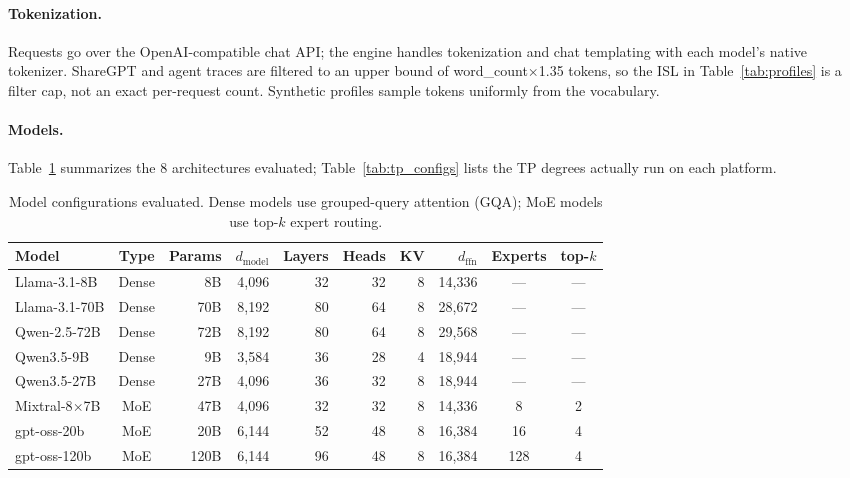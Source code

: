 \paragraph{Tokenization.} Requests go over the OpenAI-compatible chat API; the engine handles tokenization and chat templating with each model's native tokenizer. ShareGPT and agent traces are filtered to an upper bound of word\_count$\times$1.35 tokens, so the ISL in Table~\ref{tab:profiles} is a filter cap, not an exact per-request count. Synthetic profiles sample tokens uniformly from the vocabulary.

\paragraph{Models.} Table~\ref{tab:models} summarizes the 8 architectures evaluated; Table~\ref{tab:tp_configs} lists the TP degrees actually run on each platform.

\begin{table}[t]
\caption{Model configurations evaluated. Dense models use grouped-query attention (GQA); MoE models use top-$k$ expert routing.}
\label{tab:models}
\centering
\small
\begin{tabular}{lcrrrrrrcc}
\toprule
\textbf{Model} & \textbf{Type} & \textbf{Params} & \textbf{$d_\text{model}$} & \textbf{Layers} & \textbf{Heads} & \textbf{KV} & \textbf{$d_\text{ffn}$} & \textbf{Experts} & \textbf{top-$k$} \\
\midrule
Llama-3.1-8B        & Dense & 8B   & 4{,}096 & 32 & 32 & 8 & 14{,}336 & ---  & --- \\
Llama-3.1-70B       & Dense & 70B  & 8{,}192 & 80 & 64 & 8 & 28{,}672 & ---  & --- \\
Qwen-2.5-72B        & Dense & 72B  & 8{,}192 & 80 & 64 & 8 & 29{,}568 & ---  & --- \\
Qwen3.5-9B          & Dense & 9B   & 3{,}584 & 36 & 28 & 4 & 18{,}944 & ---  & --- \\
Qwen3.5-27B         & Dense & 27B  & 4{,}096 & 36 & 32 & 8 & 18{,}944 & ---  & --- \\
Mixtral-8$\times$7B & MoE   & 47B  & 4{,}096 & 32 & 32 & 8 & 14{,}336 & 8    & 2 \\
gpt-oss-20b         & MoE   & 20B  & 6{,}144 & 52 & 48 & 8 & 16{,}384 & 16   & 4 \\
gpt-oss-120b        & MoE   & 120B & 6{,}144 & 96 & 48 & 8 & 16{,}384 & 128  & 4 \\
\bottomrule
\end{tabular}
\end{table}

